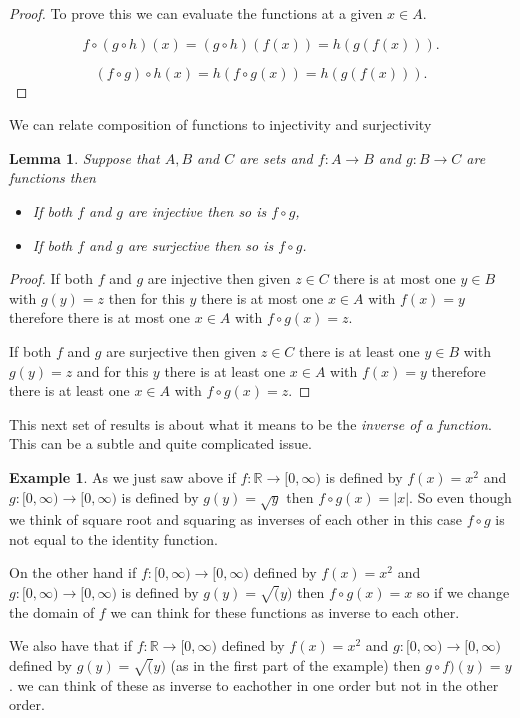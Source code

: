 \documentclass[
]{book}
\newtheorem{lemma}{Lemma}[chapter]
\theoremstyle{definition}
\theoremstyle{definition}
\newtheorem{example}{Example}[chapter]
\theoremstyle{definition}
\theoremstyle{definition}
\theoremstyle{remark}
\begin{document}
\begin{proof}
To prove this we can evaluate the functions at a given \(x \in A\).

\[f \circ (g \circ h)(x) = (g \circ h)(f(x)) = h(g(f(x))).\]

\[(f\circ g) \circ h(x) = h (f\circ g(x)) = h(g(f(x))).\]
\end{proof}

We can relate composition of functions to injectivity and surjectivity

\begin{lemma}

Suppose that \(A, B\) and \(C\) are sets and \(f: A \rightarrow B\) and \(g: B \rightarrow C\) are functions then

\begin{itemize}
\item
  If both \(f\) and \(g\) are injective then so is \(f \circ g\),
\item
  If both \(f\) and \(g\) are surjective then so is \(f \circ g\).
\end{itemize}

\end{lemma}

\begin{proof}
If both \(f\) and \(g\) are injective then given \(z \in C\) there is at most one \(y \in B\) with \(g(y)=z\) then for this \(y\) there is at most one \(x \in A\) with \(f(x) = y\) therefore there is at most one \(x \in A\) with \(f\circ g(x) = z\).

If both \(f\) and \(g\) are surjective then given \(z \in C\) there is at least one \(y \in B\) with \(g(y) = z\) and for this \(y\) there is at least one \(x \in A\) with \(f(x) = y\) therefore there is at least one \(x \in A\) with \(f \circ g (x) = z\).
\end{proof}

This next set of results is about what it means to be the \emph{inverse of a function}. This can be a subtle and quite complicated issue.

\begin{example}
As we just saw above if \(f: \mathbb{R} \rightarrow [0,\infty)\) is defined by \(f(x) = x^2\) and \(g: [0,\infty) \rightarrow [0, \infty)\) is defined by \(g(y) = \sqrt{y}\) then \(f \circ g (x) = |x|\). So even though we think of square root and squaring as inverses of each other in this case \(f \circ g\) is not equal to the identity function.

On the other hand if \(f : [0, \infty) \rightarrow [0, \infty)\) defined by \(f(x)=x^2\) and \(g: [0,\infty) \rightarrow [0,\infty)\) is defined by \(g(y) = \sqrt(y)\) then \(f \circ g(x) = x\) so if we change the domain of \(f\) we can think for these functions as inverse to each other.

We also have that if \(f: \mathbb{R} \rightarrow [0,\infty)\) defined by \(f(x) = x^2\) and \(g: [0, \infty) \rightarrow [0,\infty)\) defined by \(g(y) = \sqrt(y)\) (as in the first part of the example) then \(g\circ f)(y) = y\). we can think of these as inverse to eachother in one order but not in the other order.
\end{example}
\end{document}
